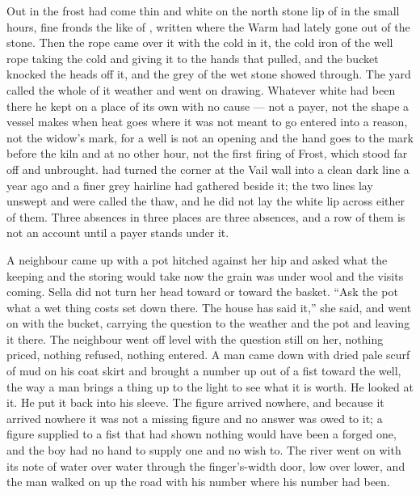 Out in  the frost had come thin and white on the north stone lip of  in the small hours, fine fronds the like of , written where the Warm had lately gone out of the stone. Then the rope came over it with the cold in it, the cold iron of the well rope taking the cold and giving it to the hands that pulled, and the bucket knocked the heads off it, and the grey of the wet stone showed through. The yard called the whole of it weather and went on drawing. Whatever white had been there he kept on a place of its own with no cause --- not a payer, not the shape a vessel makes when heat goes where it was not meant to go entered into a reason, not the widow's mark, for a well is not an opening and the hand goes to the mark before the kiln and at no other hour, not the first firing of Frost, which stood far off and unbrought.  had turned the corner at the Vail wall into a clean dark line a year ago and a finer grey hairline had gathered beside it; the two lines lay unswept and were called the thaw, and he did not lay the white lip across either of them. Three absences in three places are three absences, and a row of them is not an account until a payer stands under it.

A neighbour came up with a pot hitched against her hip and asked what the keeping and the storing would take now the grain was under wool and the visits coming. Sella did not turn her head toward  or toward the basket. “Ask the pot what a wet thing costs set down there. The house has said it,” she said, and went on with the bucket, carrying the question to the weather and the pot and leaving it there. The neighbour went off level with the question still on her, nothing priced, nothing refused, nothing entered. A man came down  with dried pale scurf of mud on his coat skirt and brought a number up out of a fist toward the well, the way a man brings a thing up to the light to see what it is worth. He looked at it. He put it back into his sleeve. The figure arrived nowhere, and because it arrived nowhere it was not a missing figure and no answer was owed to it; a figure supplied to a fist that had shown nothing would have been a forged one, and the boy had no hand to supply one and no wish to. The river went on with its note of water over water through the finger's-width door, low over lower, and the man walked on up the road with his number where his number had been.

\scenebreak


